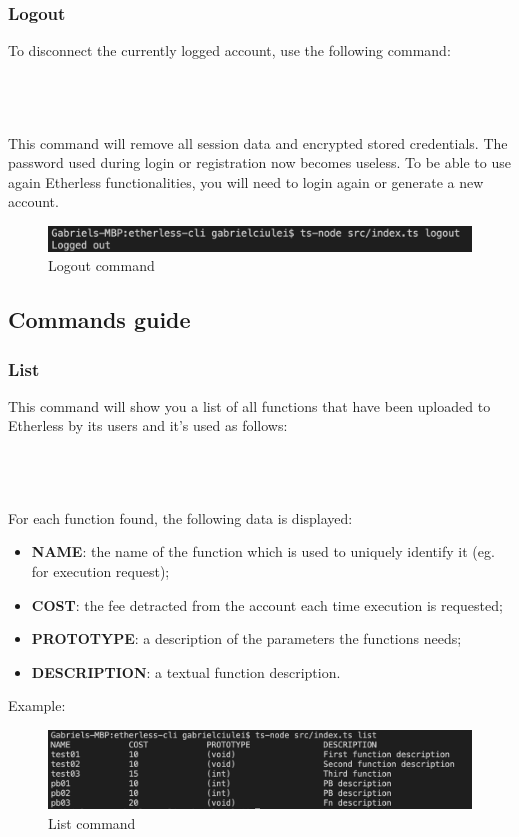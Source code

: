 \subsubsection{Logout}
To disconnect the currently logged account, use the following command:\\\\
\centerline{}\\\\
This command will remove all session data and encrypted stored credentials. The password used during login or registration now becomes useless. To be able to use again Etherless functionalities, you will need to login again or generate a new account.\\
\begin{figure}[h]
	\centering
	\includegraphics[width=\textwidth]{res/img/Screenshot_logout.png}
	\caption{Logout command}
\end{figure}
\newpage
\subsection{Commands guide}
\subsubsection{List}
This command will show you a list of all functions that have been uploaded to Etherless by its users and it's used as follows:\\\\
\centerline {}\\\\
For each function found, the following data is displayed:
\begin{itemize}
	\item \textbf{NAME}: the name of the function which is used to uniquely identify it (eg. for execution request);
	\item \textbf{COST}: the fee detracted from the account each time execution is requested;
	\item \textbf{PROTOTYPE}: a description of the parameters the functions needs;
	\item \textbf{DESCRIPTION}: a textual function description.
\end{itemize}
Example:
\begin{figure}[h]
	\begin{center}
	\includegraphics[width=\textwidth]{res/img/Screenshot_list.jpg}
	\caption{List command}
	\end{center}
\end{figure}


